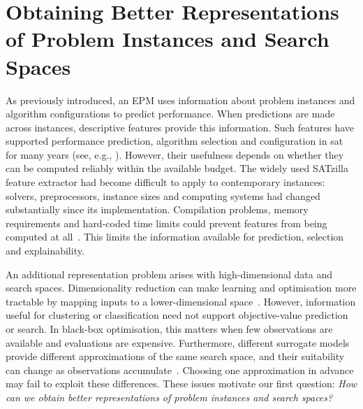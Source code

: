 
\section{Obtaining Better Representations of Problem Instances and Search Spaces}

As previously introduced, an EPM uses information about problem instances and algorithm configurations to predict performance. When predictions are made across instances, descriptive features provide this information. Such features have supported performance prediction, algorithm selection and configuration in \gls{sat} for many years (see, e.g., \citealp{NudEtAl04,XuEtAl08,HutEtAl11,HutEtAl14}). However, their usefulness depends on whether they can be computed reliably within the available budget. The widely used SATzilla feature extractor had become difficult to apply to contemporary instances: solvers, preprocessors, instance sizes and computing systems had changed substantially since its implementation. Compilation problems, memory requirements and hard-coded time limits could prevent features from being computed at all~\citep{ShaHoo24}. This limits the information available for prediction, selection and explainability.

An additional representation problem arises with high-dimensional data and search spaces. Dimensionality reduction can make learning and optimisation more tractable by mapping inputs to a lower-dimensional space~\citep{CunGha15,LetEtAl20}. However, information useful for clustering or classification need not support objective-value prediction or search. In black-box optimisation, this matters when few observations are available and evaluations are expensive. Furthermore, different surrogate models provide different approximations of the same search space, and their suitability can change as observations accumulate~\citep{HofEtAl11}. Choosing one approximation in advance may fail to exploit these differences. These issues motivate our first question: \emph{How can we obtain better representations of problem instances and search spaces?}

